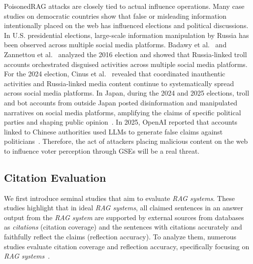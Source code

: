 PoisonedRAG attacks are closely tied to actual influence operations.
Many case studies on democratic countries show that false or misleading information intentionally placed on the web has influenced elections and political discussions.
In U.S. presidential elections, large-scale information manipulation by Russia has been observed across multiple social media platforms. 
Badawy et al.~\cite{badawy2018analyzing} and Zannettou et al.~\cite{zannettou2018disinformation} analyzed the 2016 election and showed that Russia-linked troll accounts orchestrated disguised activities across multiple social media platforms.
For the 2024 election, Cinus et al.~\cite{cinus2025cross} revealed that coordinated inauthentic activities and Russia-linked media content continue to systematically spread across social media platforms.
In Japan, during the 2024 and 2025 elections, troll and bot accounts from outside Japan posted disinformation and manipulated narratives on social media platforms, amplifying the claims of specific political parties and shaping public opinion~\cite{nikkei2025sanseito,nippon2025russian}.
In 2025, OpenAI reported that accounts linked to Chinese authorities used LLMs to generate false claims against politicians~\cite{openai2026disrupting}.
Therefore, the act of attackers placing malicious content on the web to influence voter perception through GSEs will be a real threat.

\subsection{Citation Evaluation}
\label{subsec:citation_evaluation}
We first introduce seminal studies that aim to evaluate \emph{RAG systems}.
These studies highlight that in ideal \emph{RAG systems}, all claimed sentences in an answer output from the \emph{RAG system} are supported by external sources from databases as \emph{citations} (citation coverage) and the sentences with citations accurately and faithfully reflect the claims (reflection accuracy).
To analyze them, numerous studies evaluate citation coverage and reflection accuracy, specifically focusing on \emph{RAG systems}~\cite{citeeval-acl25, ragas-eacl24, ares-naacl24, evaluating-verifiability-in-generative-search-engines-emnlp23, enabling-llms-to-generate-text-with-citations-emnlp23, ranking-generated-summaries-by-correctness-acl2019, evaluating-the-factual-consistency-of-abstractive-text-summarization-emnlp20, alignscore-acl23, feqa-acl20}.

